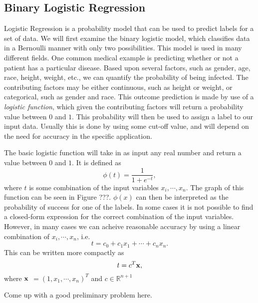 
\subsection*{Binary Logistic Regression}
Logistic Regression is a probability model that can be used to predict labels for a set of data.  We will first examine the binary logistic model, which classifies data in a Bernoulli manner with only two possibilities.  This model is used in many different fields.  One common medical example is predicting whether or not a patient has a particular disease.  Based upon several factors, such as gender, age, race, height, weight, etc., we can quantify the probability of being infected.  The contributing factors may be either continuous, such as height or weight, or categorical, such as gender and race.  This outcome prediction is made by use of a \emph{logistic function}, which given the contributing factors will return a probability value between $0$ and $1$.  This probability will then be used to assign a label to our input data.  Usually this is done by using some cut-off value, and will depend on the need for accuracy in the specific application.

The basic logistic function will take in as input any real number and return a value between $0$ and $1$.  It is defined as
\begin{equation}
\phi(t) = \frac{1}{1 + e^{-t}},
\end{equation}
where $t$ is some combination of the input variables $x_i, \cdots, x_n$.  The graph of this function can be seen in Figure ???.   $\phi(x)$ can then be interpreted as the probability of success for one of the labels.  In some cases it is not possible to find a closed-form expression for the correct combination of the input variables.  However, in many cases we can acheive reasonable accuracy by using a linear combination of $x_i, \cdots, x_n$, i.e.
\begin{equation*}
t = c_0 + c_1 x_1 + \cdots + c_n x_n.
\end{equation*}
This can be written more compactly as
\begin{equation*}
t = c^{T}\bf{x},
\end{equation*}
where $\bf{x}$ $= (1, x_1, \cdots , x_n)^{T}$ and $c \in \mathbb{R}^{n+1}$ 

\begin{problem}
Come up with a good preliminary problem here.
\end{problem}


